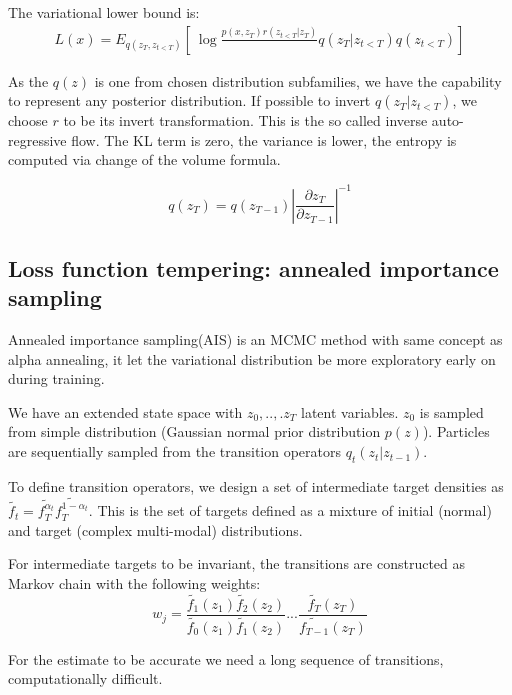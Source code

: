 \documentclass[10pt,letterpaper]{article}
\begin{document}
The variational lower bound is:
\begin{align*}
    L(x) = E_{q(z_T, z_{t<T})}[\ 
    \log \frac{p(x, z_T) r(z_{t<T} | z_T)} \ 
    {q(z_T | z_{t<T}) q(z_{t<T})} ]
\end{align*}

As the $q(z)$ is one from chosen distribution subfamilies, we have the capability to represent any posterior distribution.
If possible to invert $q(z_T | z_{t<T})$, we choose $r$ to be its invert transformation. This is the so called inverse auto-regressive flow. The KL term is zero, the variance is lower, the entropy is computed via change of the volume formula.

\begin{equation}
    q(z_T) = q(z_{T-1}) |\frac{\partial z_T}{\partial z_{T-1}}|^{-1}
\end{equation}

\subsection*{Loss function tempering: annealed importance sampling}

Annealed importance sampling(AIS) is an MCMC method with same concept as alpha annealing, it let the variational distribution be more exploratory early on during training.

We have an extended state space with $z_0, ..,. z_T$ latent variables.
$z_0$ is sampled from simple distribution (Gaussian normal prior distribution $p(z)$).
Particles are sequentially sampled from the transition operators $q_t(z_t|z_{t−1})$.

To define transition operators, we design a set of intermediate target densities as 
$\tilde{f_t} = \tilde{f_T^{\alpha_t}}\tilde{f_T^{1 - \alpha_t}}$.
This is the set of targets defined as a mixture of initial (normal) and target (complex multi-modal) distributions.

For intermediate targets to be invariant, the transitions are constructed as Markov chain with the following weights:
\begin{equation*}
    w_j = \frac{\tilde{f_1}(z_1)\tilde{f_2}(z_2)}{\tilde{f_0}(z_1)\tilde{f_1}(z_2)} ... \frac{\tilde{f_T}(z_T)}{\tilde{f_{T-1}}(z_{T})}
\end{equation*}

For the estimate to be accurate we need a long sequence of transitions, computationally difficult.
\end{document}
